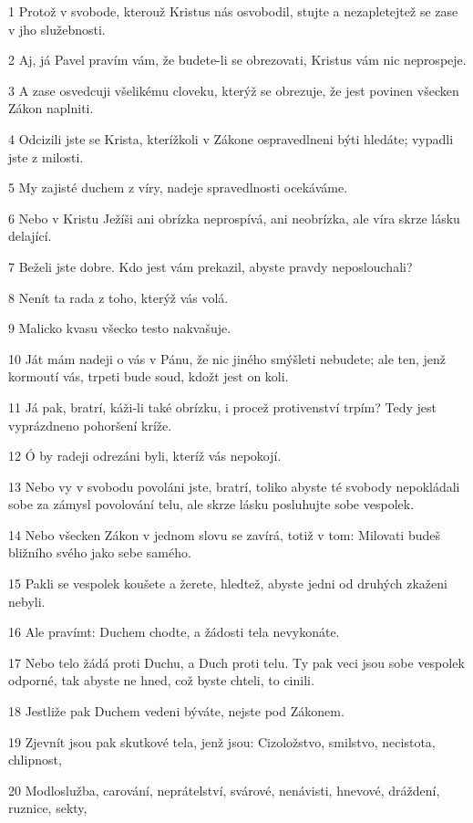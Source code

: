 \par 1 Protož v svobode, kterouž Kristus nás osvobodil, stujte a nezapletejtež se zase v jho služebnosti.
\par 2 Aj, já Pavel pravím vám, že budete-li se obrezovati, Kristus vám nic neprospeje.
\par 3 A zase osvedcuji všelikému cloveku, kterýž se obrezuje, že jest povinen všecken Zákon naplniti.
\par 4 Odcizili jste se Krista, kterížkoli v Zákone ospravedlneni býti hledáte; vypadli jste z milosti.
\par 5 My zajisté duchem z víry, nadeje spravedlnosti ocekáváme.
\par 6 Nebo v Kristu Ježíši ani obrízka neprospívá, ani neobrízka, ale víra skrze lásku delající.
\par 7 Beželi jste dobre. Kdo jest vám prekazil, abyste pravdy neposlouchali?
\par 8 Nenít ta rada z toho, kterýž vás volá.
\par 9 Malicko kvasu všecko testo nakvašuje.
\par 10 Ját mám nadeji o vás v Pánu, že nic jiného smýšleti nebudete; ale ten, jenž kormoutí vás, trpeti bude soud, kdožt jest on koli.
\par 11 Já pak, bratrí, káži-li také obrízku, i procež protivenství trpím? Tedy jest vyprázdneno pohoršení kríže.
\par 12 Ó by radeji odrezáni byli, kteríž vás nepokojí.
\par 13 Nebo vy v svobodu povoláni jste, bratrí, toliko abyste té svobody nepokládali sobe za zámysl povolování telu, ale skrze lásku posluhujte sobe vespolek.
\par 14 Nebo všecken Zákon v jednom slovu se zavírá, totiž v tom: Milovati budeš bližního svého jako sebe samého.
\par 15 Pakli se vespolek koušete a žerete, hledtež, abyste jedni od druhých zkaženi nebyli.
\par 16 Ale pravímt: Duchem chodte, a žádosti tela nevykonáte.
\par 17 Nebo telo žádá proti Duchu, a Duch proti telu. Ty pak veci jsou sobe vespolek odporné, tak abyste ne hned, což byste chteli, to cinili.
\par 18 Jestliže pak Duchem vedeni býváte, nejste pod Zákonem.
\par 19 Zjevnít jsou pak skutkové tela, jenž jsou: Cizoložstvo, smilstvo, necistota, chlipnost,
\par 20 Modloslužba, carování, neprátelství, svárové, nenávisti, hnevové, dráždení, ruznice, sekty,
